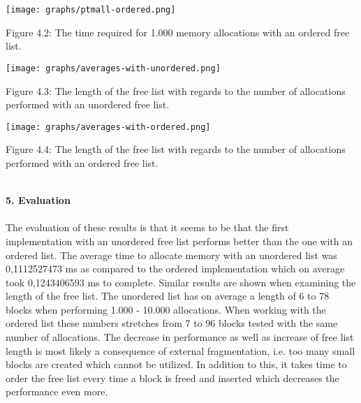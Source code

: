 \documentclass[a4paper,10pt]{article}
\begin{document}
\begin{footnotesize}
\begin{center}{
\centering\texttt{[image: graphs/ptmall-ordered.png]}\par
\caption{Figure 4.2: The time required for 1.000 memory allocations with an ordered free list.}}
\end{center}
\end{footnotesize}

\begin{footnotesize}
\begin{center}{
\centering\texttt{[image: graphs/averages-with-unordered.png]}\par
\caption{Figure 4.3: The length of the free list with regards to the number of allocations performed with an unordered free list.}}
\end{center}
\end{footnotesize}

\begin{footnotesize}
\begin{center}{
\centering\texttt{[image: graphs/averages-with-ordered.png]}\par
\caption{Figure 4.4: The length of the free list with regards to the number of allocations performed with an ordered free list.}}
\end{center}
\end{footnotesize}

\maketitle
\textbf
{\\5. Evaluation\\\\}
The evaluation of these results is that it seems to be that the first implementation with an unordered free list performs better than the one with an ordered list. The average time to allocate memory with an unordered list was 0,1112527473 ms as compared to the ordered implementation which on average took 0,1243406593 ms to complete. Similar results are shown when examining the length of the free list. The unordered list has on average a length of 6 to 78 blocks when performing 1.000 - 10.000 allocations. When working with the ordered list these numbers stretches from 7 to 96 blocks tested with the same number of allocations. The decrease in performance as well as increase of free list length is most likely a consequence of external fragmentation, i.e. too many small blocks are created which cannot be utilized. In addition to this, it takes time to order the free list every time a block is freed and inserted which decreases the performance even more. 
\end{document}
